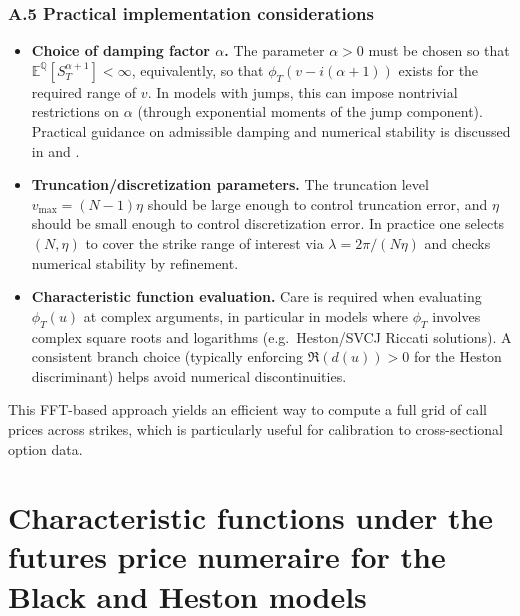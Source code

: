 \documentclass[a4paper,titlepage,12pt]{report}
\theoremstyle{plain}
\begin{document}
\subsection*{A.5 Practical implementation considerations}

\begin{itemize}
\item \textbf{Choice of damping factor $\alpha$.}
The parameter $\alpha>0$ must be chosen so that $\mathbb{E}^{\mathbb{Q}}[S_T^{\alpha+1}]<\infty$,
equivalently, so that $\phi_T(v-i(\alpha+1))$ exists for the required range of $v$.
In models with jumps, this can impose nontrivial restrictions on $\alpha$ (through exponential
moments of the jump component). Practical guidance on admissible damping and numerical stability is
discussed in \citet{CarrMadan1999} and \citet{Lee2004}.

\item \textbf{Truncation/discretization parameters.}
The truncation level $v_{\max}=(N-1)\eta$ should be large enough to control truncation error, and
$\eta$ should be small enough to control discretization error. In practice one selects
$(N,\eta)$ to cover the strike range of interest via $\lambda=2\pi/(N\eta)$ and checks numerical
stability by refinement.

\item \textbf{Characteristic function evaluation.}
Care is required when evaluating $\phi_T(u)$ at complex arguments, in particular in models where
$\phi_T$ involves complex square roots and logarithms (e.g.\ Heston/SVCJ Riccati solutions). A
consistent branch choice (typically enforcing $\Re(d(u))>0$ for the Heston discriminant) helps avoid
numerical discontinuities.
\end{itemize}

\noindent
This FFT-based approach yields an efficient way to compute a full grid of call prices across
strikes, which is particularly useful for calibration to cross-sectional option data.


\newpage


\chapter{Characteristic functions under the futures price numeraire for the Black and Heston models}
\label{app:cf_black_heston}
\setcounter{equation}{0} %
\renewcommand{\theequation}{B.\arabic{equation}} %
\end{document}

